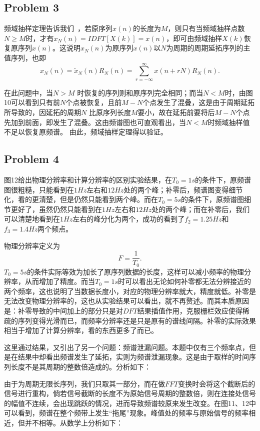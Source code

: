 \documentclass[a4paper,11pt,onecolumn,twoside]{article}
\begin{document}
\subsection{Problem 3}
频域抽样定理告诉我们~\supercite{course1,course2}，若原序列$x(n)$的长度为$M$，则只有当频域抽样点数$N\geq M$时，才有$x_{N}(n) = IDFT[X(k)] = x(n)$，即可由频域抽样$X(k)$恢复原序列$x(n)$。这说明$x_N(n)$为原序列$x(n)$以$N$为周期的周期延拓序列的主值序列，也即
\begin{equation}
x_N(n) = \tilde{x}_N(n)R_N(n) = \sum_{r = -\infty}^{\infty}x(n+rN) R_N(n).
\end{equation}

在此问题中，当$N>M$ 时恢复的序列则和原序列完全相同；而当$N<M$时，由图10可以看到只有前$N$个点被恢复，且前$M-N$个点发生了混叠，这是由于周期延拓所导致的，因延拓的周期$N$ 比原序列长度$M$要小，故在延拓前要将后$M-N$个点先加到前面，即发生了混叠。这由频谱图也可直观看出，当$N<M$时频域抽样值不足以恢复原频谱。
由此，频域抽样定理得以验证。

\subsection{Problem 4}
图12给出物理分辨率和计算分辨率的区别实验结果，在$T_0=1s$的条件下，原频谱图很粗糙，只能看到在$1Hz$左右和$12Hz$处的两个峰；补零后，频谱图变得细节化，看的更清楚，但是仍然只能看到两个峰。而在$T_0=5s$的条件下，原频谱图细节更好了，虽然仍然只能看到在$1Hz$左右和$12Hz$处的两个峰；而在补零后，我们可以清楚地看到在$1Hz$左右的峰分化为两个，成功的看到了$f_2=1.25Hz$和$f_3=1.4Hz$两个频点。

物理分辨率定义为
\begin{equation}
F = \frac{1}{T_0}.
\end{equation}
$T_0=5s$的条件实际等效为加长了原序列数据的长度，这样可以减小频率的物理分辨率，从而增加了精度。而当$T_0=1s$时可以看出无论如何补零都无法分辨接近的两个频率，这也说明了当数据长度小，对应的物理分辨率就大，精度就低。补零是无法改变物理分辨率的，这也从实验结果可以看出，就不再赘述。而其本质原因是：补零导致的中间加上的部分只是对$DFT$结果插值作用，克服栅栏效应使得稀疏的序列变得光滑而已，而频率分辨率还是只是原有的谱线间隔。补零的实际效果相当于增加了计算分辨率，看的东西更多了而已。

这里通过结果，又引出了另一个问题：频谱泄漏问题。本题中仅有三个频率点，但是在结果中却看出频谱发生了延拓，实则为频谱泄漏现象。这是由于取样的时间序列长度不是其周期的整数倍造成的。分析如下：

由于为周期无限长序列，我们只取其一部分，而在做$FFT$变换时会将这个截断后的信号进行重构，倘若信号截断的长度不为原始信号周期的整数倍，则在连接处信号的幅值不连续，会出现跳跃的情况，进而导致频谱较原来发生改变。在图11、12中可以看到，频谱在整个频带上发生``拖尾''现象。峰值处的频率与原始信号的频率相近，但并不相等。从数学上分析如下：
\end{document}
